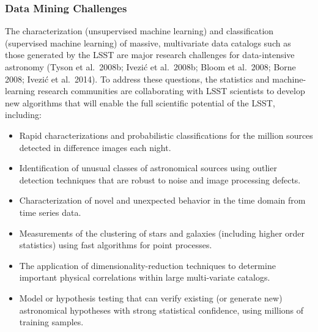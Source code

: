 \documentclass{emulateapj}
\newcommand{\B}[1]{{#1}}
\begin{document}
\B{
\subsubsection{Data Mining Challenges}

The characterization (unsupervised machine learning) and classification (supervised machine learning) of 
massive, multivariate data catalogs such as those generated by the LSST are major research challenges for 
data-intensive astronomy (Tyson et al.~2008b; Ivezi\'{c} et al.~2008b;
Bloom et al.~2008; Borne 2008; Ivezi\'c et al.~2014). To address these questions, the statistics and machine-learning research 
communities are collaborating with LSST scientists to develop new algorithms that will enable the full 
scientific potential of the LSST, including:
\begin{itemize}
\item Rapid characterizations and probabilistic classifications for
  the million sources
          detected in difference images each night.
\item Identification of unusual classes of astronomical sources using outlier detection techniques that are 
          robust to noise and image processing defects.
\item Characterization of novel and unexpected behavior in the time domain from time series data.
\item Measurements of the clustering of stars and galaxies (including higher order statistics) using fast 
          algorithms for point processes.
\item The application of dimensionality-reduction techniques to determine important physical correlations 
          within large multi-variate catalogs.
\item Model or hypothesis testing that can verify existing (or generate new) astronomical hypotheses with 
          strong statistical confidence, using millions of training samples.
\end{itemize}

}
\end{document}

